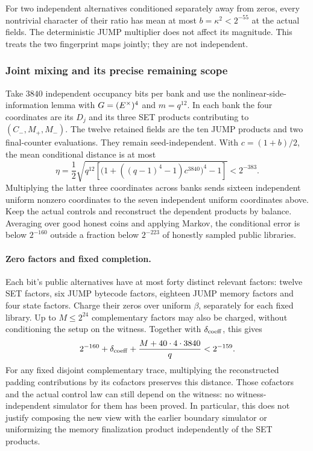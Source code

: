 For two independent alternatives conditioned separately away from zeros, every nontrivial character of their ratio has mean at most $b=\kappa^2<2^{-55}$ at the actual fields. The deterministic JUMP multiplier does not affect its magnitude. This treats the two fingerprint maps jointly; they are not independent.

\subsubsection{Joint mixing and its precise remaining scope}

Take $3840$ independent occupancy bits per bank and use the nonlinear-side-information lemma with $G=(E^\times)^4$ and $m=q^{12}$. In each bank the four coordinates are its $D_j$ and its three SET products contributing to $(C_-,M_+,M_-)$. The twelve retained fields are the ten JUMP products and two final-counter evaluations. They remain seed-independent. With $c=(1+b)/2$, the mean conditional distance is at most
\[
 \eta=\frac12\sqrt{q^{12}\left[
  \bigl(1+((q-1)^4-1)c^{3840}\bigr)^4-1\right]}<2^{-383}.
\]
Multiplying the latter three coordinates across banks sends sixteen independent uniform nonzero coordinates to the seven independent uniform coordinates above. Keep the actual controls and reconstruct the dependent products by balance. Averaging over good honest coins and applying Markov, the conditional error is below $2^{-160}$ outside a fraction below $2^{-223}$ of honestly sampled public libraries.

\paragraph{Zero factors and fixed completion.} Each bit's public alternatives have at most forty distinct relevant factors: twelve SET factors, six JUMP bytecode factors, eighteen JUMP memory factors and four state factors. Charge their zeros over uniform $\beta$, separately for each fixed library. Up to $M\le2^{24}$ complementary factors may also be charged, without conditioning the setup on the witness. Together with $\delta_{\rm coeff}$, this gives
\[
 2^{-160}+\delta_{\rm coeff}+\frac{M+40\cdot4\cdot3840}{q}<2^{-159}.
\]
For any fixed disjoint complementary trace, multiplying the reconstructed padding contributions by its cofactors preserves this distance. Those cofactors and the actual control law can still depend on the witness: no witness-independent simulator for them has been proved. In particular, this does not justify composing the new view with the earlier boundary simulator or uniformizing the memory finalization product independently of the SET products.

